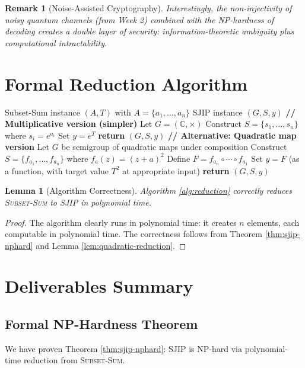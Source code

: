 \documentclass[11pt]{article}
\newtheorem{lemma}[theorem]{Lemma}
\newtheorem{remark}[theorem]{Remark}
\begin{document}
\begin{remark}[Noise-Assisted Cryptography]
Interestingly, the non-injectivity of noisy quantum channels (from Week 2) combined with the NP-hardness of decoding creates a double layer of security: information-theoretic ambiguity plus computational intractability.
\end{remark}

\section{Formal Reduction Algorithm}

\begin{algorithm}
\caption{Polynomial-Time Reduction: Subset-Sum to SJIP}
\label{alg:reduction}
\begin{algorithmic}[1]
\REQUIRE Subset-Sum instance $(A, T)$ with $A = \{a_1, \dots, a_n\}$
\ENSURE SJIP instance $(G, S, y)$
\STATE \textbf{// Multiplicative version (simpler)}
\STATE Let $G = (\mathbb{C}, \times)$
\STATE Construct $S = \{s_1, \dots, s_n\}$ where $s_i = e^{a_i}$
\STATE Set $y = e^T$
\STATE \textbf{return} $(G, S, y)$
\STATE
\STATE \textbf{// Alternative: Quadratic map version}
\STATE Let $G$ be semigroup of quadratic maps under composition
\STATE Construct $S = \{f_{a_1}, \dots, f_{a_n}\}$ where $f_a(z) = (z + a)^2$
\STATE Define $F = f_{a_n} \circ \cdots \circ f_{a_1}$
\STATE Set $y = F$ (as a function, with target value $T^2$ at appropriate input)
\STATE \textbf{return} $(G, S, y)$
\end{algorithmic}
\end{algorithm}

\begin{lemma}[Algorithm Correctness]
Algorithm \ref{alg:reduction} correctly reduces \textsc{Subset-Sum} to \textsc{SJIP} in polynomial time.
\end{lemma}
\begin{proof}
The algorithm clearly runs in polynomial time: it creates $n$ elements, each computable in polynomial time. The correctness follows from Theorem \ref{thm:sjip-nphard} and Lemma \ref{lem:quadratic-reduction}.
\end{proof}

\section{Deliverables Summary}

\subsection{Formal NP-Hardness Theorem}
We have proven Theorem \ref{thm:sjip-nphard}: \textsc{SJIP} is NP-hard via polynomial-time reduction from \textsc{Subset-Sum}.
\end{document}
